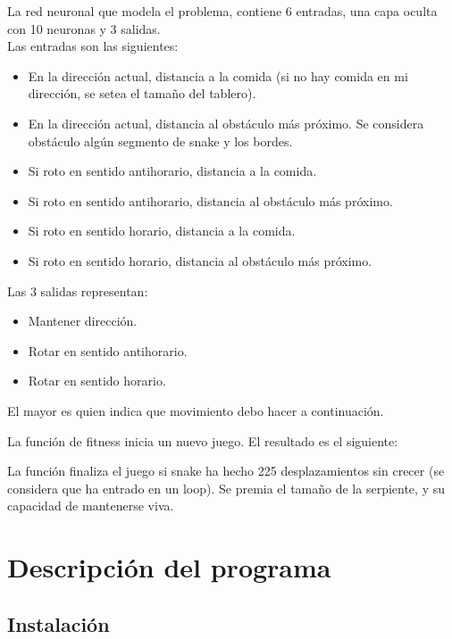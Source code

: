 \documentclass[letterpaper,11pt]{article} %
\begin{document}
La red neuronal que modela el problema, contiene 6 entradas, una capa oculta con 10 neuronas y 3 salidas. \\

Las entradas son las siguientes:

\begin{itemize}
\item  En la dirección actual, distancia a la comida (si no hay comida en mi dirección, se setea el tamaño del tablero).
\item En la dirección actual, distancia al obstáculo más próximo. Se considera obstáculo algún segmento de snake y los bordes.
\item Si roto en sentido antihorario, distancia a la comida.
\item Si roto en sentido antihorario, distancia al obstáculo más próximo.
\item Si roto en sentido horario, distancia a la comida.
\item Si roto en sentido horario, distancia al obstáculo más próximo.
\end{itemize}

Las 3 salidas representan:
\begin{itemize}
\item Mantener dirección.
\item Rotar en sentido antihorario.
\item Rotar en sentido horario.
\end{itemize}

El mayor es quien indica que movimiento debo hacer a continuación.

La función de fitness inicia un nuevo juego. El resultado es el siguiente:

La función finaliza el juego si snake ha hecho 225 desplazamientos sin crecer (se considera que ha entrado en un loop). Se premia el tamaño de la serpiente, y su capacidad de mantenerse viva.

\section{Descripción del programa}

\subsection{Instalación}
\end{document}
